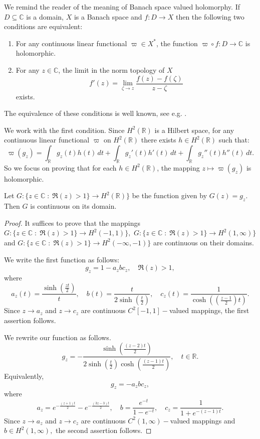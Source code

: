     We remind the reader of the meaning of Banach space valued holomorphy. If $D \subseteq \mathbb{C}$ is a domain, $X$ is a Banach space and $f:D\to X$
    then the following two conditions are equivalent:
    \begin{enumerate}[{\rm (a)}]
        \item{} For any continuous linear functional $\varpi \in X^*$, the function $\varpi\circ f:D\to \mathbb{C}$ is holomorphic.
        \item{} For any $z \in \mathbb{C}$, the limit in the norm topology of $X$
                \begin{equation*}
                    f'(z) = \lim_{\zeta\to z} \frac{f(z)-f(\zeta)}{z-\zeta}
                \end{equation*}
                exists.
    \end{enumerate}
    The equivalence of these conditions is well known, see e.g. \cite[Theorem 3.31]{rudin}.
    
    We work with the first condition. Since $H^2(\mathbb{R})$ is a Hilbert space, for any continuous linear functional $\varpi$ 
    on $H^2(\mathbb{R})$ there exists $h \in H^2(\mathbb{R})$ such that:
    \begin{equation*}
        \varpi(g_z) = \int_{\mathbb{R}} g_z(t)h(t)\,dt + \int_{\mathbb{R}} g_z'(t)h'(t)\,dt + \int_{\mathbb{R}}g_z''(t)h''(t)\,dt.
    \end{equation*}
    So we focus on proving that for each $h \in H^2(\mathbb{R})$, the mapping $z\mapsto \varpi(g_z)$ is holomorphic.
    
    
  
    
    \begin{lem}\label{computational continuity lemma} Let $G:\{z \in \mathbb{C}\;:\; \Re(z) > 1\}\to H^2(\mathbb{R})\}$ be the function given by $G(z) = g_z$. Then $G$ is continuous on its domain.    
    \end{lem}
    \begin{proof} It suffices to prove that the mappings $G:\{z \in \mathbb{C}\;:\; \Re(z) > 1\}\to H^2(-1,1)\},$ $G:\{z \in \mathbb{C}\;:\; \Re(z) > 1\}\to H^2(1,\infty)\}$ and $G:\{z \in \mathbb{C}\;:\; \Re(z) > 1\}\to H^2(-\infty,-1)\}$ are continuous on their domains.
    
    We write the first function as follows:
    $$g_z=1-a_zbc_z,\quad\Re(z)>1,$$
    where
    $$a_z(t)=\frac{\sinh(\frac{zt}{2})}{t},\quad b(t)=\frac{t}{2\sinh(\frac{t}{2})},\quad c_z(t)=\frac1{\cosh(\left(\frac{z-1}{2}\right)t)}.$$
    Since $z\to a_z$ and $z\to c_z$ are continuous $C^2[-1,1]-$valued mappings, the first assertion follows.
    
    We rewrite our function as follows.
    $$g_z=-\frac{\sinh(\frac{(z-2)t}{2})}{2\sinh(\frac{t}{2})\cosh(\frac{(z-1)t}{2})},\quad t\in\mathbb{R}.$$
    Equivalently,
    $$g_z=-a_zbc_z,$$
    where
    $$a_z=e^{-\frac{(z+1)t}{2}}-e^{-\frac{(3z-3)t}{2}},\quad b=\frac{e^{-t}}{1-e^{-t}},\quad c_z=\frac1{1+e^{-(z-1)t}}.$$
    Since $z\to a_z$ and $z\to c_z$ are continuous $C^2(1,\infty)-$valued mappings and $b\in H^2(1,\infty),$ the second assertion follows.
    \end{proof}



